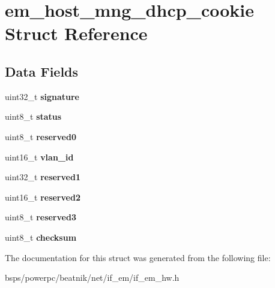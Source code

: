 \hypertarget{structem__host__mng__dhcp__cookie}{}\section{em\+\_\+host\+\_\+mng\+\_\+dhcp\+\_\+cookie Struct Reference}
\label{structem__host__mng__dhcp__cookie}
\subsection*{Data Fields}
\begin{DoxyCompactItemize}
\item 
\mbox{\label{structem__host__mng__dhcp__cookie_ae1a1cbd5b91a01ebd0d131e9e55b1657}} 
uint32\+\_\+t {\bfseries signature}
\item 
\mbox{\label{structem__host__mng__dhcp__cookie_a931e0dec5510e27896d981fa3d13b02c}} 
uint8\+\_\+t {\bfseries status}
\item 
\mbox{\label{structem__host__mng__dhcp__cookie_a6d2790a5ebd3c2b19de33e0eaf827405}} 
uint8\+\_\+t {\bfseries reserved0}
\item 
\mbox{\label{structem__host__mng__dhcp__cookie_a93f8922e022dc28eb692cf9773ab4cbe}} 
uint16\+\_\+t {\bfseries vlan\+\_\+id}
\item 
\mbox{\label{structem__host__mng__dhcp__cookie_ab28468524e3092a39d9cd4c97501ddb4}} 
uint32\+\_\+t {\bfseries reserved1}
\item 
\mbox{\label{structem__host__mng__dhcp__cookie_aeab1c9dc6b5d5baa5272c7a556316f30}} 
uint16\+\_\+t {\bfseries reserved2}
\item 
\mbox{\label{structem__host__mng__dhcp__cookie_a4305aab72261dbdaa0d5ad3c8dd001bd}} 
uint8\+\_\+t {\bfseries reserved3}
\item 
\mbox{\label{structem__host__mng__dhcp__cookie_aaffe1ba72a5c15bc6e8bad83c9f9cdc1}} 
uint8\+\_\+t {\bfseries checksum}
\end{DoxyCompactItemize}


The documentation for this struct was generated from the following file\+:\begin{DoxyCompactItemize}
\item 
bsps/powerpc/beatnik/net/if\+\_\+em/if\+\_\+em\+\_\+hw.\+h\end{DoxyCompactItemize}
